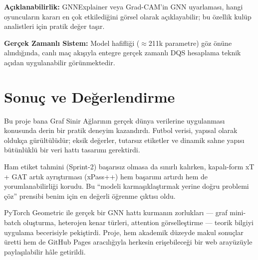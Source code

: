 \documentclass[conference]{IEEEtran}
\begin{document}
\textbf{Açıklanabilirlik:} GNNExplainer veya Grad-CAM'in GNN uyarlaması, hangi
oyuncuların kararı en çok etkilediğini görsel olarak açıklayabilir; bu özellik
kulüp analistleri için pratik değer taşır.

\textbf{Gerçek Zamanlı Sistem:} Model hafifliği ($\approx$211k parametre) göz önüne
alındığında, canlı maç akışıyla entegre gerçek zamanlı DQS hesaplama teknik
açıdan uygulanabilir görünmektedir.

\section{Sonuç ve Değerlendirme}

Bu proje bana Graf Sinir Ağlarının gerçek dünya verilerine uygulanması konusunda
derin bir pratik deneyim kazandırdı. Futbol verisi, yapısal olarak oldukça
gürültülüdür; eksik değerler, tutarsız etiketler ve dinamik sahne yapısı bütünlüklü
bir veri hattı tasarımı gerektirdi.

Ham etiket tahmini (Sprint-2) başarısız olmasa da sınırlı kalırken, kapalı-form
xT + GAT artık ayrıştırması (xPass++) hem başarımı artırdı hem de yorumlanabilirliği
korudu. Bu ``modeli karmaşıklaştırmak yerine doğru problemi çöz'' prensibi benim
için en değerli öğrenme çıktısı oldu.

PyTorch Geometric ile gerçek bir GNN hattı kurmanın zorlukları --- graf mini-batch
oluşturma, heterojen kenar türleri, attention görselleştirme --- teorik bilgiyi
uygulama becerisiyle pekiştirdi. Proje, hem akademik düzeyde makul sonuçlar üretti
hem de GitHub Pages aracılığıyla herkesin erişebileceği bir web arayüzüyle
paylaşılabilir hâle getirildi.
\end{document}
